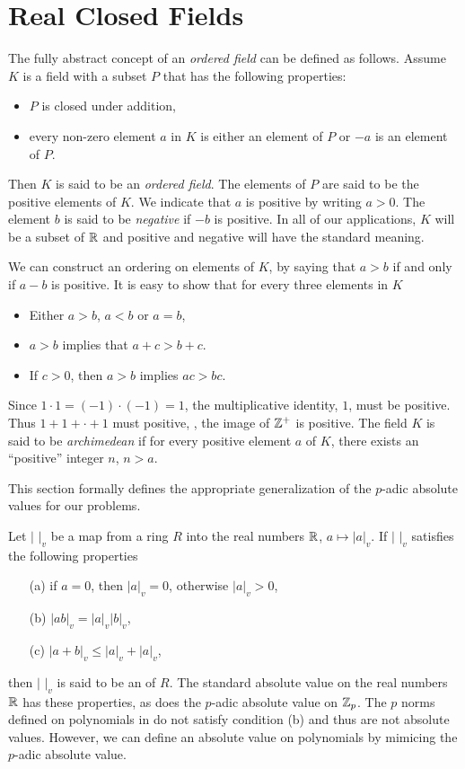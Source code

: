 \chapter{Real Closed Fields}
\label{Real:Chap}

The fully abstract concept of an {\em ordered field} can be defined as
follows.  Assume $K$ is a field with a subset $P$ that has the following
properties:
\begin{itemize}
\item $P$ is closed under addition,
\item every non-zero element $a$ in $K$ is either an element of $P$ or
$-a$ is an element of $P$.
\end{itemize}
Then $K$ is said to be an {\em ordered
field}.  The elements of $P$ are said to be
the positive elements of $K$. We indicate that
$a$ is positive by writing $a > 0$.  The element $b$ is said to be
{\em negative} if $-b$ is positive.  In all of our applications, $K$
will be a subset of $\mathbb{R}$ and positive and negative will have the
standard meaning.  

We can construct an ordering on elements of $K$, by
saying that $a > b$ if and only if $a - b$ is positive.  It is easy to
show that for every three elements in $K$ 
\begin{itemize}
\item Either $a> b$, $a < b$ or $a = b$, 
\item $a > b$ implies that $a + c > b + c$.
\item If $c> 0$, then $a>b$ implies $ac > bc$.
\end{itemize}

Since $1 \cdot 1 = (-1) \cdot (-1) = 1$, the multiplicative identity,
$1$, must be positive.  Thus $1 + 1 + \cdot + 1$ must positive, \ie,
the image of $\mathbb{Z}^{+}$ is positive.  The field $K$ is said to be {\em
archimedean} if for every positive element $a$ of $K$, there exists an
``positive'' integer $n$, $n > a$. 



This section formally defines the
appropriate generalization of the $p$-adic absolute values for our
problems.

Let $|\,\,|_v$ be a map from a ring $R$ into the real numbers $\mathbb{R}$,
$a \mapsto |a|_v$.  If $|\,\,|_v$ satisfies the following properties
\begin{itemize}
\item[(a)] if $a = 0$, then $|a|_v = 0$, otherwise $|a|_v > 0$,
\item[(b)] $|ab|_v = |a|_v |b|_v$,
\item[(c)] $|a + b|_v \le |a|_v + |a|_v$,
\end{itemize}
then $|\,\,|_v$ is said to be an  of $R$.  The
standard absolute value on the real numbers $\mathbb{R}$ has these properties,
as does the $p$-adic absolute value on $\mathbb{Z}_p$.  The $p$ norms defined
on polynomials in  do not satisfy condition (b)
and thus are not absolute values.  However, we can define an absolute
value on polynomials by mimicing the $p$-adic absolute value. 

